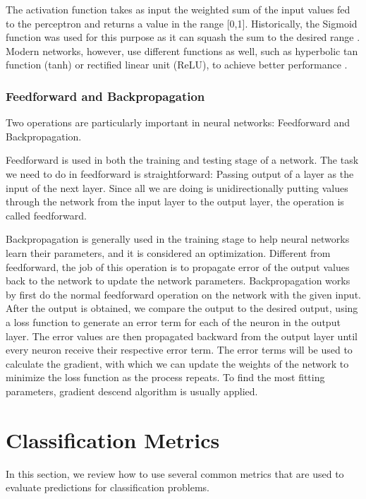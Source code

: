 The activation function takes as input the weighted sum of the input values fed to the perceptron and returns a value in the range [0,1]. 
Historically, the Sigmoid function was used for this purpose as it can squash the sum to the desired range \cite{li2015cs231n}. 
Modern networks, however, use different functions as well, such as hyperbolic tan function (tanh) or rectified linear unit (ReLU), to achieve better performance \cite{li2015cs231n}.

\subsubsection{Feedforward and Backpropagation}

Two operations are particularly important in neural networks: Feedforward and Backpropagation.

Feedforward is used in both the training and testing stage of a network. 
The task we need to do in feedforward is straightforward: Passing output of a layer as the input of the next layer.
Since all we are doing is unidirectionally putting values through the network from the input layer to the output layer, the operation is called feedforward. 

Backpropagation is generally used in the training stage to help neural networks learn their parameters, and it is considered an optimization. 
Different from feedforward, the job of this operation is to propagate error of the output values back to the network to update the network parameters. 
Backpropagation works by first do the normal feedforward operation on the network with the given input. 
After the output is obtained, we compare the output to the desired output, using a loss function to generate an error term for each of the neuron in the output layer. 
The error values are then propagated backward from the output layer until every neuron receive their respective error term. 
The error terms will be used to calculate the gradient, with which we can update the weights of the network to minimize the loss function as the process repeats. 
To find the most fitting parameters, gradient descend algorithm is usually applied.

\section{Classification Metrics}

In this section, we review how to use several common metrics that are used to evaluate predictions for classification problems.

